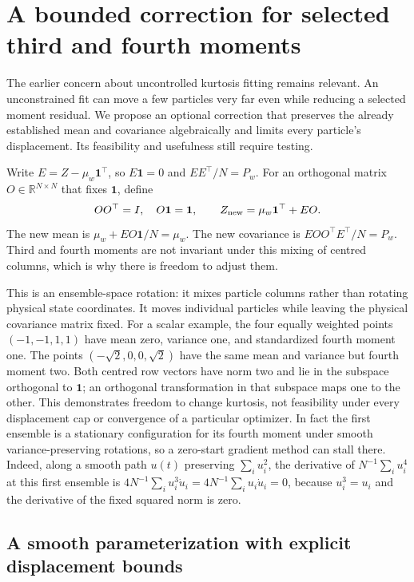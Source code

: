 \documentclass[11pt,a4paper]{article}
\newcommand{\R}{\mathbb R}
\newcommand{\one}{\mathbf 1}
\begin{document}
\section{A bounded correction for selected third and fourth moments}

The earlier concern about uncontrolled kurtosis fitting remains relevant.
An unconstrained fit can move a few particles very far even while reducing
a selected moment residual. We propose an optional correction that preserves
the already established mean and covariance algebraically and limits every
particle's displacement. Its feasibility and usefulness still require testing.

Write \(E=Z-\mu_w\one^\top\), so \(E\one=0\) and \(EE^\top/N=P_w\).
For an orthogonal matrix \(O\in\R^{N\times N}\) that fixes \(\one\), define
\begin{equation}
\label{eq:orthogonal-repair}
 OO^\top=I,\quad O\one=\one,\qquad
 Z_{\rm new}=\mu_w\one^\top+EO.
\end{equation}
The new mean is \(\mu_w+EO\one/N=\mu_w\).
The new covariance is \(EOO^\top E^\top/N=P_w\).
Third and fourth moments are not invariant under this mixing of centred
columns, which is why there is freedom to adjust them.

This is an ensemble-space rotation: it mixes particle columns rather than
rotating physical state coordinates. It moves individual particles while
leaving the physical covariance matrix fixed. For a scalar example, the
four equally weighted points \((-1,-1,1,1)\) have mean zero, variance one,
and standardized fourth moment one. The points
\((-\sqrt2,0,0,\sqrt2)\) have the same mean and variance but fourth moment
two. Both centred row vectors have norm two and lie in the subspace
orthogonal to \(\one\); an orthogonal transformation in that subspace
maps one to the other. This demonstrates freedom to change kurtosis,
not feasibility under every displacement cap or convergence of a
particular optimizer. In fact the first ensemble is a stationary
configuration for its fourth moment under smooth variance-preserving
rotations, so a zero-start gradient method can stall there.
Indeed, along a smooth path \(u(t)\) preserving \(\sum_i u_i^2\),
the derivative of \(N^{-1}\sum_i u_i^4\) at this first ensemble is
\(4N^{-1}\sum_i u_i^3\dot u_i
=4N^{-1}\sum_i u_i\dot u_i=0\), because \(u_i^3=u_i\) and
the derivative of the fixed squared norm is zero.

\subsection{A smooth parameterization with explicit displacement bounds}
\end{document}
